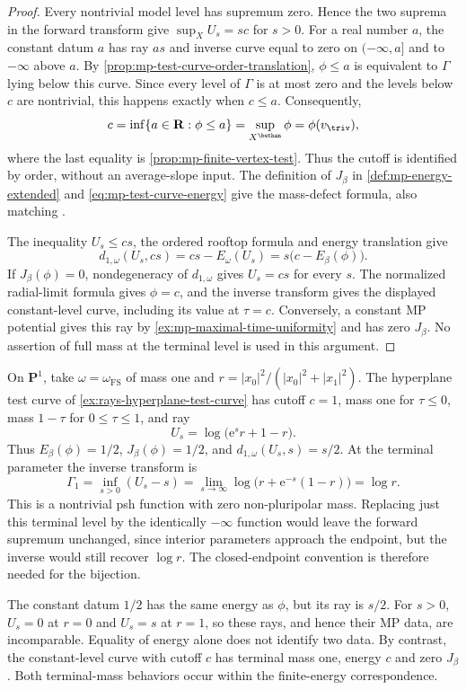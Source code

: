 \begin{proof}
Every nontrivial model level has supremum zero. Hence the two suprema in the forward transform give $\sup_XU_s=sc$ for $s>0$. For a real number $a$, the constant datum $a$ has ray $as$ and inverse curve equal to zero on $(-\infty,a]$ and to $-\infty$ above $a$. By \cref{prop:mp-test-curve-order-translation}, $\phi\leq a$ is equivalent to $\Gamma$ lying below this curve. Since every level of $\Gamma$ is at most zero and the levels below $c$ are nontrivial, this happens exactly when $c\leq a$. Consequently,
\[
 c=\inf\{a\in\mathbf R:\phi\leq a\}
   =\sup_{X^{\bethan}}\phi=\phi(v_{\triv}),
\]
where the last equality is \cref{prop:mp-finite-vertex-test}. Thus the cutoff is identified by order, without an average-slope input. The definition of $J_\beta$ in \cref{def:mp-energy-extended} and \eqref{eq:mp-test-curve-energy} give the mass-defect formula, also matching \cite[equation~(35)]{DXZ23}.

The inequality $U_s\leq cs$, the ordered rooftop formula and energy translation give
\[
 d_{1,\omega}(U_s,cs)=cs-E_\omega(U_s)
                    =s\bigl(c-E_\beta(\phi)\bigr).
\]
If $J_\beta(\phi)=0$, nondegeneracy of $d_{1,\omega}$ gives $U_s=cs$ for every $s$. The normalized radial-limit formula gives $\phi=c$, and the inverse transform gives the displayed constant-level curve, including its value at $\tau=c$. Conversely, a constant MP potential gives this ray by \cref{ex:mp-maximal-time-uniformity} and has zero $J_\beta$. No assertion of full mass at the terminal level is used in this argument.
\end{proof}

\begin{example}\label{ex:mp-test-curve-endpoint-defect}
On $\mathbf P^1$, take $\omega=\omega_{\mathrm{FS}}$ of mass one and $r=|x_0|^2/(|x_0|^2+|x_1|^2)$. The hyperplane test curve of \cref{ex:rays-hyperplane-test-curve} has cutoff $c=1$, mass one for $\tau\leq0$, mass $1-\tau$ for $0\leq\tau\leq1$, and ray
\[
 U_s=\log\bigl(\mathrm e^s r+1-r\bigr).
\]
Thus $E_\beta(\phi)=1/2$, $J_\beta(\phi)=1/2$, and $d_{1,\omega}(U_s,s)=s/2$. At the terminal parameter the inverse transform is
\[
 \Gamma_1=\inf_{s>0}(U_s-s)
         =\lim_{s\to\infty}\log\bigl(r+\mathrm e^{-s}(1-r)\bigr)
         =\log r.
\]
This is a nontrivial psh function with zero non-pluripolar mass. Replacing just this terminal level by the identically $-\infty$ function would leave the forward supremum unchanged, since interior parameters approach the endpoint, but the inverse would still recover $\log r$. The closed-endpoint convention is therefore needed for the bijection.

The constant datum $1/2$ has the same energy as $\phi$, but its ray is $s/2$. For $s>0$, $U_s=0$ at $r=0$ and $U_s=s$ at $r=1$, so these rays, and hence their MP data, are incomparable. Equality of energy alone does not identify two data. By contrast, the constant-level curve with cutoff $c$ has terminal mass one, energy $c$ and zero $J_\beta$. Both terminal-mass behaviors occur within the finite-energy correspondence.
\end{example}

